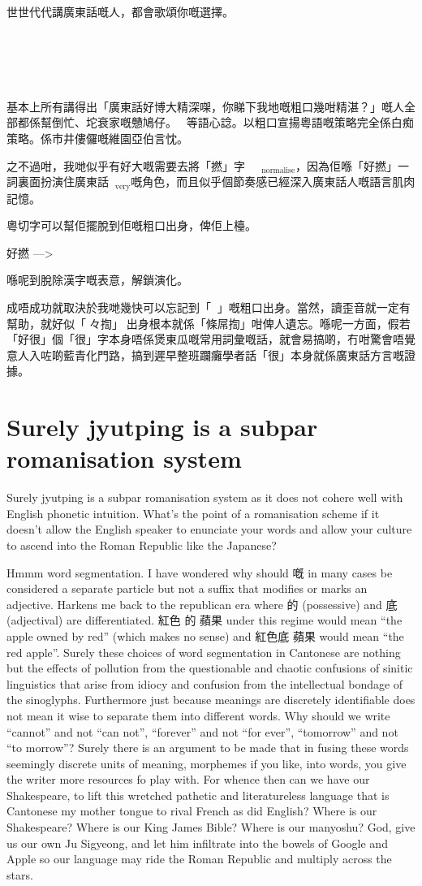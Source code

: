 \documentclass[a5paper, 10pt, openany]{book} %
\begin{document}
世世代代講廣東話嘅人，都會歌頌你嘅選擇。

\chapter{}
基本上所有講得出「廣東話好博大精深㗎，你睇下我地嘅粗口幾咁精湛？」嘅人全部都係幫倒忙、坨衰家嘅戇鳩仔。等語心諗。以粗口宣揚粵語嘅策略完全係白痴策略。係市井僂儸嘅維園亞伯言忱。

之不過咁，我哋似乎有好大嘅需要去將「撚」字 $_{\text{normalise}}$，因為佢喺「好撚」一詞裏面扮演住廣東話$_{\text{very}}$嘅角色，而且似乎個節奏感已經深入廣東話人嘅語言肌肉記憶。

粵切字可以幫佢擺脫到佢嘅粗口出身，俾佢上檯。

好撚 —> 󱭱󰹱

喺呢到脫除漢字嘅表意，解鎖演化。

成唔成功就取決於我哋幾快可以忘記到「」嘅粗口出身。當然，讀歪音就一定有幫助，就好似「々揈」󱝚出身根本就係「條屌揈」咁俾人遺忘。喺呢一方面，假若「好很」個「很」字本身唔係煲東瓜嘅常用詞彙嘅話，就會易搞啲，冇咁驚會唔覺意人入咗啲藍青化門路，搞到遲早整班躝癱學者話「很」本身就係廣東話方言嘅證據。


\chapter{Surely jyutping is a subpar romanisation system}
Surely jyutping is a subpar romanisation system as it does not cohere well with English phonetic intuition. What’s the point of a romanisation scheme if it doesn’t allow the English speaker to enunciate your words and allow your culture to ascend into the Roman Republic like the Japanese?


Hmmm word segmentation. I have wondered why should 嘅 in many cases be considered a separate particle but not a suffix that modifies or marks an adjective. Harkens me back to the republican era where 的 (possessive) and 底 (adjectival) are differentiated. 紅色 的 蘋果 under this regime would mean “the apple owned by red” (which makes no sense) and 紅色底 蘋果  would mean “the red apple”. Surely these choices of word segmentation in Cantonese are nothing but the effects of pollution from the questionable and chaotic confusions of sinitic linguistics that arise from idiocy and confusion from the intellectual bondage of the  sinoglyphs.
Furthermore just because meanings are discretely identifiable does not mean it wise to separate them into different words. Why should we write “cannot” and not “can not”, “forever” and not “for ever”, “tomorrow” and not “to morrow”?
Surely there is an argument to be made that in fusing these words seemingly discrete units of meaning, morphemes if you like, into words, you give the writer more resources fo play with. For whence then can we have our Shakespeare, to lift this wretched pathetic and literatureless language that is Cantonese my mother tongue to rival French as did English? Where is our Shakespeare? Where is our King James Bible? Where is our manyoshu? God, give us our own Ju Sigyeong, and let him infiltrate into the bowels of Google and Apple so our language may ride the Roman Republic and multiply across the stars.
\end{document}
